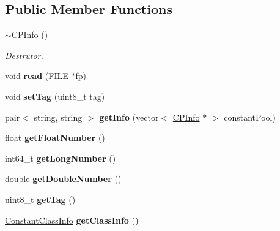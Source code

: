 \subsection*{Public Member Functions}
\begin{DoxyCompactItemize}
\item 
\hyperlink{classCPInfo_a1144cdca5a5bba9e8709ad6a20053bc7}{$\sim$\+C\+P\+Info} ()
\begin{DoxyCompactList}\small\item\em Destrutor. \end{DoxyCompactList}\item 
void {\bfseries read} (F\+I\+LE $\ast$fp)\hypertarget{classCPInfo_ab5fffd0d4433673806891f92edd67826}{}\label{classCPInfo_ab5fffd0d4433673806891f92edd67826}

\item 
void {\bfseries set\+Tag} (uint8\+\_\+t tag)\hypertarget{classCPInfo_aaa647d37b2b238aafcacddd027aeafe8}{}\label{classCPInfo_aaa647d37b2b238aafcacddd027aeafe8}

\item 
pair$<$ string, string $>$ {\bfseries get\+Info} (vector$<$ \hyperlink{classCPInfo}{C\+P\+Info} $\ast$ $>$ constant\+Pool)\hypertarget{classCPInfo_a331977da199d8fa56995f9de3bcb837b}{}\label{classCPInfo_a331977da199d8fa56995f9de3bcb837b}

\item 
float {\bfseries get\+Float\+Number} ()\hypertarget{classCPInfo_ab1f2f8f848bcc2fec287a243ee19ee69}{}\label{classCPInfo_ab1f2f8f848bcc2fec287a243ee19ee69}

\item 
int64\+\_\+t {\bfseries get\+Long\+Number} ()\hypertarget{classCPInfo_adec66ffc8ee4a552223e7b232a1ab5c1}{}\label{classCPInfo_adec66ffc8ee4a552223e7b232a1ab5c1}

\item 
double {\bfseries get\+Double\+Number} ()\hypertarget{classCPInfo_a65f562eac59444e0571e665f0af4bfc4}{}\label{classCPInfo_a65f562eac59444e0571e665f0af4bfc4}

\item 
uint8\+\_\+t {\bfseries get\+Tag} ()\hypertarget{classCPInfo_abea4ee7bf02eec0d9d5b86fc90f024f1}{}\label{classCPInfo_abea4ee7bf02eec0d9d5b86fc90f024f1}

\item 
\hyperlink{structConstantClassInfo}{Constant\+Class\+Info} {\bfseries get\+Class\+Info} ()\hypertarget{classCPInfo_a64411575d297ff8b50684ca5b0c93471}{}\label{classCPInfo_a64411575d297ff8b50684ca5b0c93471}


\end{DoxyCompactItemize}
